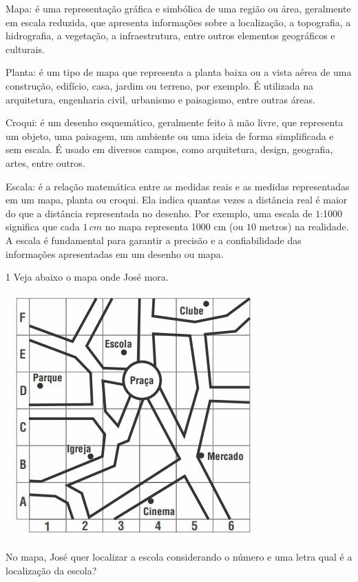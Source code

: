 Mapa: é uma representação gráfica e simbólica de uma região ou área,
geralmente em escala reduzida, que apresenta informações sobre a
localização, a topografia, a hidrografia, a vegetação, a infraestrutura,
entre outros elementos geográficos e culturais.

Planta: é um tipo de mapa que representa a planta baixa ou a vista aérea
de uma construção, edifício, casa, jardim ou terreno, por exemplo. É
utilizada na arquitetura, engenharia civil, urbanismo e paisagismo,
entre outras áreas.

Croqui: é um desenho esquemático, geralmente feito à mão livre, que
representa um objeto, uma paisagem, um ambiente ou uma ideia de forma
simplificada e sem escala. É usado em diversos campos, como arquitetura,
design, geografia, artes, entre outros.

Escala: é a relação matemática entre as medidas reais e as medidas
representadas em um mapa, planta ou croqui. Ela indica quantas vezes a
distância real é maior do que a distância representada no desenho. Por
exemplo, uma escala de $1$:1000 significa que cada $1\,cm$ no mapa representa
1000 cm (ou $10$ metros) na realidade. A escala é fundamental para
garantir a precisão e a confiabilidade das informações apresentadas em
um desenho ou mapa.


\num{1}  Veja abaixo o mapa onde José mora.

\includegraphics[width=3.86042in,height=3.68611in]{./imgSAEB_6_MAT/media/image64.png}

No mapa, José quer localizar a escola considerando o número e uma letra
qual é a localização da escola?

